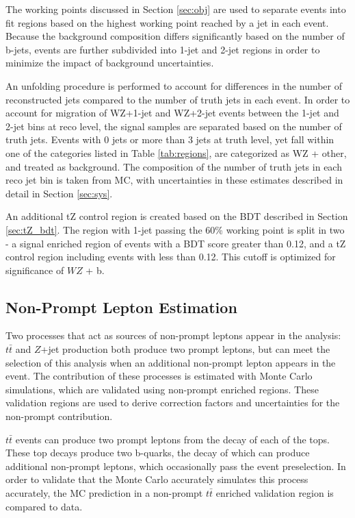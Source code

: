 The working points discussed in Section \ref{sec:obj} are used to separate events into fit regions based on the highest working point reached by a jet in each event. Because the background composition differs significantly based on the number of b-jets, events are further subdivided into 1-jet and 2-jet regions in order to minimize the impact of background uncertainties.

An unfolding procedure is performed to account for differences in the number of reconstructed jets compared to the number of truth jets in each event. In order to account for migration of WZ+1-jet and WZ+2-jet events between the 1-jet and 2-jet bins at reco level, the signal samples are separated based on the number of truth jets. Events with 0 jets or more than 3 jets at truth level, yet fall within one of the categories listed in Table \ref{tab:regions}, are categorized as WZ + other, and treated as background. The composition of the number of truth jets in each reco jet bin is taken from MC, with uncertainties in these estimates described in detail in Section \ref{sec:sys}. 

An additional tZ control region is created based on the BDT described in Section \ref{sec:tZ_bdt}. The region with 1-jet passing the 60\% working point is split in two - a signal enriched region of events with a BDT score greater than 0.12, and a tZ control region including events with less than 0.12. This cutoff is optimized for significance of $WZ$ + b.

\subsection{Non-Prompt Lepton Estimation}
\label{sec:fakes}

Two processes that act as sources of non-prompt leptons appear in the analysis: $t\bar{t}$ and $Z$+jet production both produce two prompt leptons, but can meet the selection of this analysis when an additional non-prompt lepton appears in the event. The contribution of these processes is estimated with Monte Carlo simulations, which are validated using non-prompt enriched regions. These validation regions are used to derive correction factors and uncertainties for the non-prompt contribution.

$t\bar{t}$ events can produce two prompt leptons from the decay of each of the tops. These top decays produce two b-quarks, the decay of which can produce additional non-prompt leptons, which occasionally pass the event preselection. In order to validate that the Monte Carlo accurately simulates this process accurately, the MC prediction in a non-prompt $t\bar{t}$ enriched validation region is compared to data.

